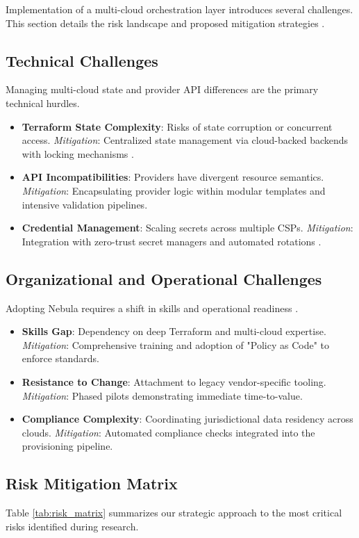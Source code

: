 Implementation of a multi-cloud orchestration layer introduces several challenges. This section details the risk landscape and proposed mitigation strategies \cite{brikman2019terraform}.

\subsection{Technical Challenges}
Managing multi-cloud state and provider API differences are the primary technical hurdles. 
\begin{itemize}
    \item \textbf{Terraform State Complexity}: Risks of state corruption or concurrent access. \textit{Mitigation}: Centralized state management via cloud-backed backends with locking mechanisms \cite{hashicorp2024terraform}.
    \item \textbf{API Incompatibilities}: Providers have divergent resource semantics. \textit{Mitigation}: Encapsulating provider logic within modular templates and intensive validation pipelines.
    \item \textbf{Credential Management}: Scaling secrets across multiple CSPs. \textit{Mitigation}: Integration with zero-trust secret managers and automated rotations \cite{hashicorp_sentinel_2024}.
\end{itemize}

\subsection{Organizational and Operational Challenges}
Adopting Nebula requires a shift in skills and operational readiness \cite{armbrust2010view}.
\begin{itemize}
    \item \textbf{Skills Gap}: Dependency on deep Terraform and multi-cloud expertise. \textit{Mitigation}: Comprehensive training and adoption of "Policy as Code" to enforce standards.
    \item \textbf{Resistance to Change}: Attachment to legacy vendor-specific tooling. \textit{Mitigation}: Phased pilots demonstrating immediate time-to-value.
    \item \textbf{Compliance Complexity}: Coordinating jurisdictional data residency across clouds. \textit{Mitigation}: Automated compliance checks integrated into the provisioning pipeline.
\end{itemize}

\subsection{Risk Mitigation Matrix}
Table \ref{tab:risk_matrix} summarizes our strategic approach to the most critical risks identified during research.

